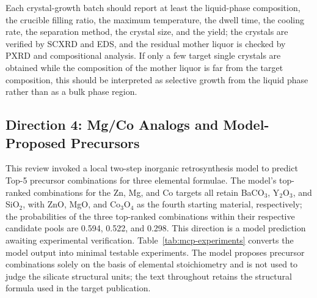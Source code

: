 Each crystal-growth batch should report at least the liquid-phase composition, the crucible filling ratio, the maximum temperature, the dwell time, the cooling rate, the separation method, the crystal size, and the yield; the crystals are verified by SCXRD and EDS, and the residual mother liquor is checked by PXRD and compositional analysis. If only a few target single crystals are obtained while the composition of the mother liquor is far from the target composition, this should be interpreted as selective growth from the liquid phase rather than as a bulk phase region.

\subsection{Direction 4: Mg\slash Co Analogs and Model-Proposed Precursors}

This review invoked a local two-step inorganic retrosynthesis model to predict Top-5 precursor combinations for three elemental formulae. The model's top-ranked combinations for the Zn, Mg, and Co targets all retain BaCO$_3$, Y$_2$O$_3$, and SiO$_2$, with ZnO, MgO, and Co$_3$O$_4$ as the fourth starting material, respectively; the probabilities of the three top-ranked combinations within their respective candidate pools are 0.594, 0.522, and 0.298. This direction is a model prediction awaiting experimental verification. Table~\ref{tab:mcp-experiments} converts the model output into minimal testable experiments. The model proposes precursor combinations solely on the basis of elemental stoichiometry and is not used to judge the silicate structural units; the text throughout retains the structural formula used in the target publication.

